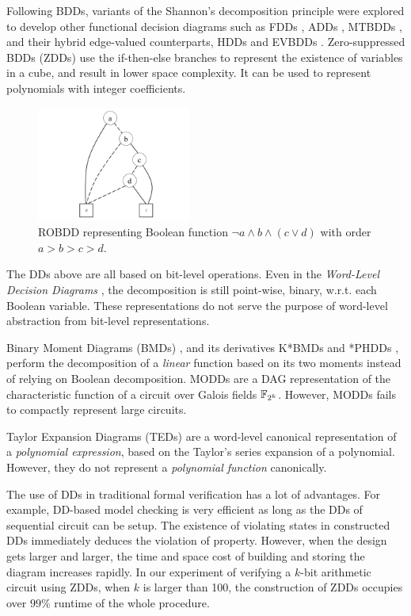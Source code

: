 Following BDDs,  variants of the Shannon's decomposition principle
were explored to develop other functional decision diagrams such as
 FDDs \cite{okfdd}, ADDs \cite{add}, MTBDDs \cite{mtbdd}, and their hybrid 
edge-valued counterparts, HDDs \cite{hdd} and EVBDDs \cite{evbdd}. 
Zero-suppressed BDDs (ZDDs) \cite{minato1993zero,minato1994calculation} use the if-then-else branches
to represent the existence of variables in a cube, and result in lower 
space complexity. It can be used to represent polynomials with integer coefficients.

\begin{figure}[h]
\centerline{
\includegraphics[width=0.45\textwidth]{newfig/BDD.pdf}
}
\caption{ROBDD representing Boolean function $\neg a \land b \land (c\lor d)$ with order $a>b>c>d$.}
\label{fig:BDD}
\end{figure}

The DDs above are all based on bit-level operations. Even in the {\it Word-Level Decision Diagrams}
\cite{WLS}, the decomposition is still point-wise, binary, 
w.r.t. each Boolean variable. These representations do not
serve the purpose of word-level abstraction from bit-level
representations. 

Binary Moment Diagrams (BMDs) \cite{bmd}, and its derivatives K*BMDs
\cite{kbmd} and *PHDDs \cite{phdd}, perform the decomposition of a {\it linear} function
based on its two moments instead of relying on Boolean decomposition. 
MODDs \cite{modd,modd_tcomp} are a DAG representation of the
characteristic function of a circuit over Galois fields ${\mathbb{F}}_{2^k}$. 
However, MODDs fails to compactly represent large circuits.


Taylor Expansion Diagrams (TEDs) \cite{ted_tcomp} are a
word-level canonical representation of a {\it polynomial expression},
based on the Taylor's series expansion of a polynomial. However, they do
not represent a {\it polynomial function} canonically. 

The use of DDs in traditional formal verification has a lot of advantages. 
For example, DD-based model checking is very efficient as long as the DDs of sequential 
circuit can be setup. The existence of violating states in constructed DDs 
immediately deduces the violation of property. However, when the design gets
larger and larger, the time and space cost of building and storing the diagram 
increases rapidly. In our experiment of verifying a $k$-bit arithmetic circuit 
using ZDDs, when $k$ is larger than 100, the construction of ZDDs occupies 
over $99\%$ runtime of the whole procedure.
